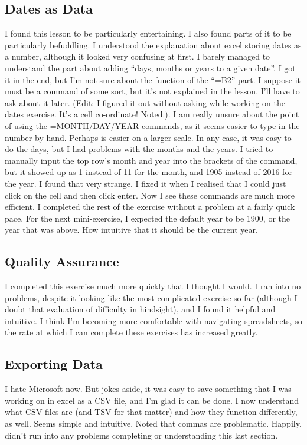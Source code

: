 \documentclass{article}
\begin{document}
\subsection{Dates as Data}
I found this lesson to be particularly entertaining. I also found parts of it to be particularly befuddling. I understood the explanation about excel storing dates as a number, although it looked very confusing at first. I barely managed to understand the part about adding “days, months or years to a given date”. I got it in the end, but I’m not sure about the function of the “=B2” part. I suppose it must be a command of some sort, but it’s not explained in the lesson. I’ll have to ask about it later. (Edit: I figured it out without asking while working on the dates exercise. It’s a cell co-ordinate! Noted.). I am really unsure about the point of using the =MONTH/DAY/YEAR commands, as it seems easier to type in the number by hand. Perhaps is easier on a larger scale. In any case, it was easy to do the days, but I had problems with the months and the years. I tried to manually input the top row's month and year into the brackets of the command, but it showed up as 1 instead of 11 for the month, and 1905 instead of 2016 for the year. I found that very strange. I fixed it when I realised that I could just click on the cell and then click enter. Now I see these commands are much more efficient. I completed the rest of the exercise without a problem at a fairly quick pace. For the next mini-exercise, I expected the default year to be 1900, or the year that was above. How intuitive that it should be the current year.
\subsection{Quality Assurance}
I completed this exercise much more quickly that I thought I would. I ran into no problems, despite it looking like the most complicated exercise so far (although I doubt that evaluation of difficulty in hindsight), and I found it helpful and intuitive. I think I’m becoming more comfortable with navigating spreadsheets, so the rate at which I can complete these exercises has increased greatly.
\subsection{Exporting Data}
I hate Microsoft now. But jokes aside, it was easy to save something that I was working on in excel as a CSV file, and I’m glad it can be done. I now understand what CSV files are (and TSV for that matter) and how they function differently, as well. Seems simple and intuitive. Noted that commas are problematic. Happily, didn’t run into any problems completing or understanding this last section.
\end{document}
